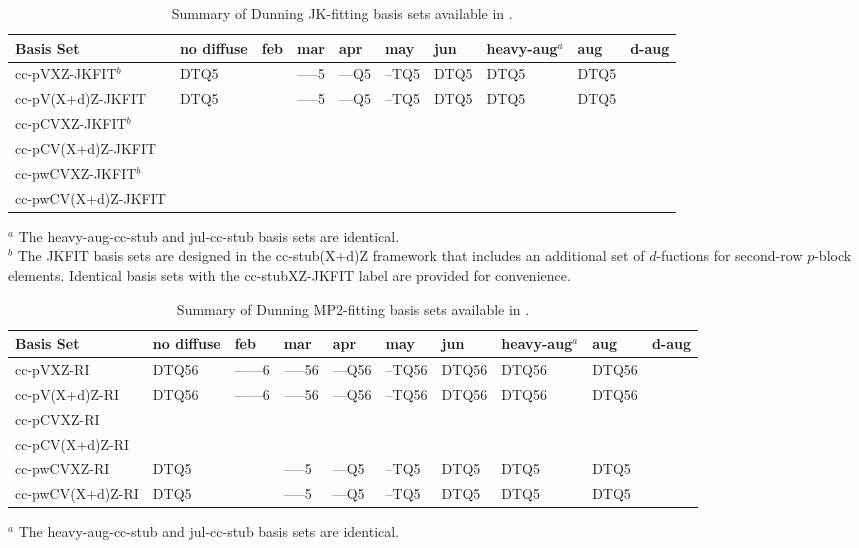 \begin{table}[!htbp]
\begin{footnotesize}
\caption{Summary of Dunning JK-fitting basis sets available in \PSIfour.} \label{table:basisDunningJKFIT}
\parsep 10pt
\begin{center}
\begin{tabular}{llllllllll} 
\hline\hline
Basis Set            & no diffuse & feb & mar & apr & may & jun & heavy-aug$^a$ & aug & d-aug \\
\hline
cc-pVXZ-JKFIT$^b$    & DTQ5 &  & --{}--{}--5 & --{}--Q5 & --TQ5 &  DTQ5  & DTQ5  & DTQ5  &  \\
cc-pV(X+d)Z-JKFIT    & DTQ5 &  & --{}--{}--5 & --{}--Q5 & --TQ5 &  DTQ5  & DTQ5  & DTQ5  &  \\
cc-pCVXZ-JKFIT$^b$   \\
cc-pCV(X+d)Z-JKFIT   \\
cc-pwCVXZ-JKFIT$^b$  \\
cc-pwCV(X+d)Z-JKFIT  \\
\hline\hline
\end{tabular}
\end{center}
$^a$ The heavy-aug-cc-stub and jul-cc-stub basis sets are identical. \\
$^b$ The JKFIT basis sets are designed in the cc-stub(X+d)Z framework that includes an additional set of
$d$-fuctions for second-row $p$-block elements. Identical basis sets with the cc-stubXZ-JKFIT label are provided
for convenience.
\end{footnotesize}
\end{table}


\begin{table}[!htbp]
\begin{footnotesize}
\caption{Summary of Dunning MP2-fitting basis sets available in \PSIfour.} \label{table:basisDunningMP2FIT}
\parsep 10pt
\begin{center}
\begin{tabular}{llllllllll} 
\hline\hline
Basis Set            & no diffuse & feb & mar & apr & may & jun & heavy-aug$^a$ & aug & d-aug \\
\hline
cc-pVXZ-RI           & DTQ56 & --{}--{}--{}--6 & --{}--{}--56 & --{}--Q56 & --TQ56 & DTQ56 & DTQ56 & DTQ56 &  \\
cc-pV(X+d)Z-RI       & DTQ56 & --{}--{}--{}--6 & --{}--{}--56 & --{}--Q56 & --TQ56 & DTQ56 & DTQ56 & DTQ56 &  \\
cc-pCVXZ-RI          \\
cc-pCV(X+d)Z-RI      \\
cc-pwCVXZ-RI         & DTQ5  &                 & --{}--{}--5  & --{}--Q5  & --TQ5  & DTQ5  & DTQ5  & DTQ5  &  \\
cc-pwCV(X+d)Z-RI     & DTQ5  &                 & --{}--{}--5  & --{}--Q5  & --TQ5  & DTQ5  & DTQ5  & DTQ5  &  \\
\hline\hline
\end{tabular}
\end{center}
$^a$ The heavy-aug-cc-stub and jul-cc-stub basis sets are identical.
\end{footnotesize}
\end{table}


